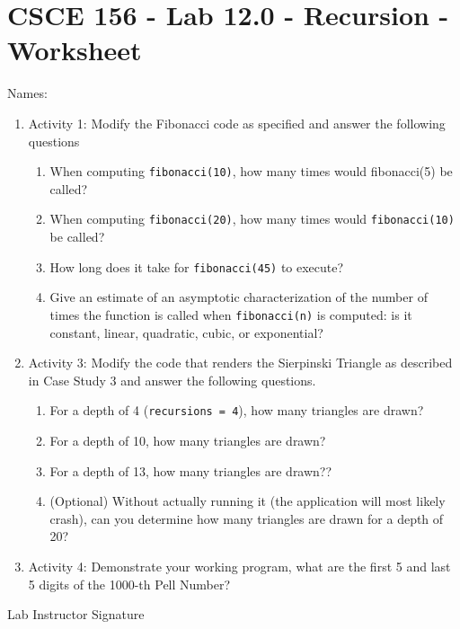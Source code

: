 \documentclass[12pt]{scrartcl}
\begin{document}
\section*{CSCE 156 - Lab 12.0 - Recursion - Worksheet}

Names: \underline{\hspace{10cm}}


\begin{enumerate}
  \item Activity 1: Modify the Fibonacci code as specified 
  and answer the following questions
  \begin{enumerate}
    \item When computing \texttt{fibonacci(10)}, how 
    many times would fibonacci(5) be called?
    \item When computing \texttt{fibonacci(20)}, how 
    many times would \texttt{fibonacci(10)} be called?
    \item How long does it take for \texttt{fibonacci(45)} 
    to execute?
    \item Give an estimate of an asymptotic characterization 
    of the number of times the function is called when 
    \texttt{fibonacci(n)} is computed: is it 
    constant, linear, quadratic, cubic, or exponential?
  \end{enumerate}
  
  \item Activity 3: Modify the code that renders the Sierpinski 
  Triangle as described in Case Study 3 and answer the following 
  questions.
  \begin{enumerate}
    \item For a depth of 4 (\texttt{recursions = 4}), 
    how many triangles are drawn?
    \item For a depth of 10, how many triangles are drawn?    
    \item For a depth of 13, how many triangles are drawn??    \item (Optional) Without actually running it (the application 
    will most likely crash), can you determine how many triangles 
    are drawn for a depth of 20?
  \end{enumerate}
  
  \item Activity 4: Demonstrate your working program, what are 
  the first 5 and last 5 digits of the 1000-th Pell Number?
\end{enumerate}

Lab Instructor Signature\underline{\hspace{7.5cm}}
\end{document}
